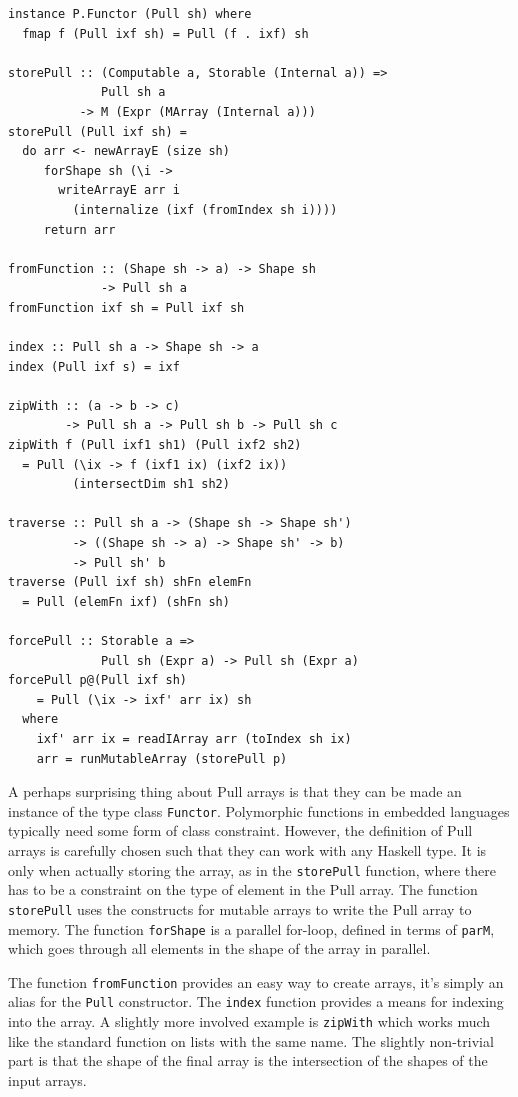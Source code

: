 \documentclass[preprint]{sigplanconf}
\begin{document}
\begin{verbatim}
instance P.Functor (Pull sh) where
  fmap f (Pull ixf sh) = Pull (f . ixf) sh

storePull :: (Computable a, Storable (Internal a)) =>
             Pull sh a
          -> M (Expr (MArray (Internal a)))
storePull (Pull ixf sh) = 
  do arr <- newArrayE (size sh)
     forShape sh (\i ->
       writeArrayE arr i
         (internalize (ixf (fromIndex sh i))))
     return arr

fromFunction :: (Shape sh -> a) -> Shape sh
             -> Pull sh a
fromFunction ixf sh = Pull ixf sh

index :: Pull sh a -> Shape sh -> a
index (Pull ixf s) = ixf

zipWith :: (a -> b -> c)
        -> Pull sh a -> Pull sh b -> Pull sh c
zipWith f (Pull ixf1 sh1) (Pull ixf2 sh2)
  = Pull (\ix -> f (ixf1 ix) (ixf2 ix))
         (intersectDim sh1 sh2)

traverse :: Pull sh a -> (Shape sh -> Shape sh')
         -> ((Shape sh -> a) -> Shape sh' -> b)
         -> Pull sh' b
traverse (Pull ixf sh) shFn elemFn
  = Pull (elemFn ixf) (shFn sh)

forcePull :: Storable a =>
             Pull sh (Expr a) -> Pull sh (Expr a)
forcePull p@(Pull ixf sh)
    = Pull (\ix -> ixf' arr ix) sh
  where
    ixf' arr ix = readIArray arr (toIndex sh ix)
    arr = runMutableArray (storePull p)
\end{verbatim}

A perhaps surprising thing about Pull arrays is that they can be made an
instance of the type class \texttt{Functor}. Polymorphic functions in
embedded languages typically need some form of class constraint.
However, the definition of Pull arrays is carefully chosen such that
they can work with any Haskell type. It is only when actually storing
the array, as in the \texttt{storePull} function, where there has to be
a constraint on the type of element in the Pull array. The function
\texttt{storePull} uses the constructs for mutable arrays to write the
Pull array to memory. The function \texttt{forShape} is a parallel
for-loop, defined in terms of \texttt{parM}, which goes through all
elements in the shape of the array in parallel.

The function \texttt{fromFunction} provides an easy way to create
arrays, it's simply an alias for the \texttt{Pull} constructor. The
\texttt{index} function provides a means for indexing into the array. A
slightly more involved example is \texttt{zipWith} which works much like
the standard function on lists with the same name. The slightly
non-trivial part is that the shape of the final array is the
intersection of the shapes of the input arrays.
\end{document}
